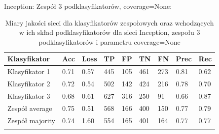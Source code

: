 \documentclass[polish,12pt]{aghthesis}
\begin{document}
\vspace{3mm}
\par\noindent Inception:
\vspace{3mm}
\newline\noindent Zespół 3 podklasyfikatorów, coverage=None:
\renewcommand{\arraystretch}{1.55}
 \begin{longtable}[h!]{|m{2.6cm}|m{1.2cm}|m{1.2cm}|m{1.2cm}|m{1.2cm}|m{1.2cm}|m{1.2cm}|m{1.2cm}|m{1.2cm}|}
 \hline
 Klasyfikator & Acc & Loss & TP & FP & TN & FN & Prec & Rec\\
 \hline
 Klasyfikator 1 & 0.71 & 0.57 & 445 & 105 & 461 & 273 & 0.81 & 0.62\\
 \hline
 Klasyfikator 2 & 0.72 & 0.54 & 502 & 142 & 424 & 216 & 0.78 & 0.70\\
 \hline
 Klasyfikator 3 & 0.68 & 0.61 & 627 & 316 & 250 & 91 & 0.66 & 0.87\\
 \hline
 Zespół average & 0.75 & 0.51 & 568 & 166 & 400 & 150 & 0.77 & 0.79\\ 
 \hline
 Zespół \newline majority & 0.74 & 1.60 & 554 & 165 & 401 & 164 & 0.77 & 0.77\\
 \hline
\caption{Miary jakości sieci dla klasyfikatorów zespołowych oraz wchodzących w ich skład podklasyfikatorów dla sieci Inception, zespołu 3 podklasyfikatorów i parametru coverage=None}
\label{table:23}
\end{longtable}
\end{document}
